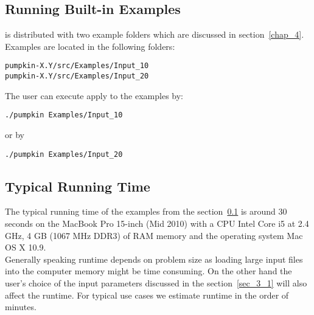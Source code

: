 
\subsection{Running Built-in Examples}
\label{sec_2_1_4}
\pump{} is distributed with two example folders which are discussed in section~\ref{chap_4}. Examples are located in the following folders:
\begin{display}
\begin{verbatim}
pumpkin-X.Y/src/Examples/Input_10
pumpkin-X.Y/src/Examples/Input_20
\end{verbatim}
\end{display}
The user can execute apply \pump{} to the examples by:
\begin{display}
\begin{verbatim}
./pumpkin Examples/Input_10
\end{verbatim}
\end{display}
or by
\begin{display}
\begin{verbatim}
./pumpkin Examples/Input_20
\end{verbatim}
\end{display}


\subsection{Typical Running Time}
\label{sec_2_1_5}
The typical running time of the examples from the section~\ref{sec_2_1_4} is around 30 seconds on the MacBook Pro 15-inch (Mid 2010) with a CPU Intel Core i5 at 2.4 GHz, 4 GB (1067 MHz DDR3) of RAM memory and the operating system Mac OS X 10.9. 
\\ Generally speaking \pump{} runtime depends on problem size as loading large input files into the computer memory might be time consuming. On the other hand the user's choice of the input parameters discussed in the section~\ref{sec_3_1} will also affect the runtime. For typical use cases we estimate runtime in the order of minutes. 















